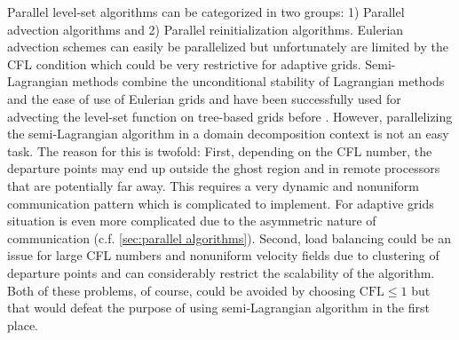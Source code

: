 Parallel level-set algorithms can be categorized in two groups: 1) Parallel advection algorithms and 2) Parallel reinitialization algorithms. Eulerian advection schemes can easily be parallelized but unfortunately are limited by the CFL condition which could be very restrictive for adaptive grids. Semi-Lagrangian methods combine the unconditional stability of Lagrangian methods and the ease of use of Eulerian grids and have been successfully used for advecting the level-set function on tree-based grids before \cite{Min;Gibou:07:A-second-order-accur}. However, parallelizing the semi-Lagrangian algorithm in a domain decomposition context is not an easy task. The reason for this is twofold: First, depending on the CFL number, the departure points may end up outside the ghost region and in remote processors that are potentially far away. This requires a very dynamic and nonuniform communication pattern which is complicated to implement. For adaptive grids situation is even more complicated due to the asymmetric nature of communication (c.f. \ref{sec:parallel algorithms}). Second, load balancing could be an issue for large CFL numbers and nonuniform velocity fields due to clustering of departure points and can considerably restrict the scalability of the algorithm. Both of these problems, of course, could be avoided by choosing $\text{CFL} \le 1$ but that would defeat the purpose of using semi-Lagrangian algorithm in the first place. 

